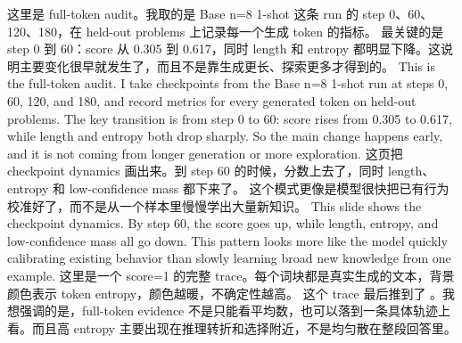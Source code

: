 {}\markdownRendererHorizontalRule{}\markdownRendererInterblockSeparator
{}\markdownRendererInterblockSeparator
{}\markdownRendererInterblockSeparator
{}这里是 full-token audit。我取的是 Base n=8 1-shot 这条 run 的 step 0、60、120、180，在 held-out problems 上记录每一个生成 token 的指标。\markdownRendererInterblockSeparator
{}最关键的是 step 0 到 60：score 从 0.305 到 0.617，同时 length 和 entropy 都明显下降。这说明主要变化很早就发生了，而且不是靠生成更长、探索更多才得到的。\markdownRendererInterblockSeparator
{}\markdownRendererInterblockSeparator
{}This is the full-token audit. I take checkpoints from the Base n=8 1-shot run at steps 0, 60, 120, and 180, and record metrics for every generated token on held-out problems.\markdownRendererInterblockSeparator
{}The key transition is from step 0 to 60: score rises from 0.305 to 0.617, while length and entropy both drop sharply. So the main change happens early, and it is not coming from longer generation or more exploration.\markdownRendererInterblockSeparator
{}\markdownRendererHorizontalRule{}\markdownRendererInterblockSeparator
{}\markdownRendererInterblockSeparator
{}\markdownRendererInterblockSeparator
{}这页把 checkpoint dynamics 画出来。到 step 60 的时候，分数上去了，同时 length、entropy 和 low-confidence mass 都下来了。\markdownRendererInterblockSeparator
{}这个模式更像是模型很快把已有行为校准好了，而不是从一个样本里慢慢学出大量新知识。\markdownRendererInterblockSeparator
{}\markdownRendererInterblockSeparator
{}This slide shows the checkpoint dynamics. By step 60, the score goes up, while length, entropy, and low-confidence mass all go down.\markdownRendererInterblockSeparator
{}This pattern looks more like the model quickly calibrating existing behavior than slowly learning broad new knowledge from one example.\markdownRendererInterblockSeparator
{}\markdownRendererHorizontalRule{}\markdownRendererInterblockSeparator
{}\markdownRendererInterblockSeparator
{}\markdownRendererInterblockSeparator
{}这里是一个 score=1 的完整 trace。每个词块都是真实生成的文本，背景颜色表示 token entropy，颜色越暖，不确定性越高。\markdownRendererInterblockSeparator
{}这个 trace 最后推到了 。我想强调的是，full-token evidence 不是只能看平均数，也可以落到一条具体轨迹上看。而且高 entropy 主要出现在推理转折和选择附近，不是均匀散在整段回答里。\markdownRendererInterblockSeparator

